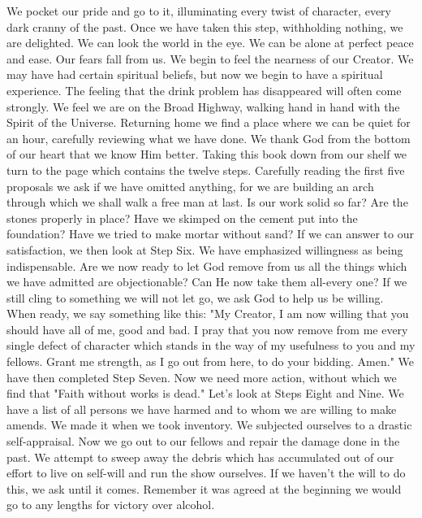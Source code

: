 \begin{biblechapter}
We pocket our pride and go to it, illuminating every twist of character, every dark cranny of the past.  Once we have taken this step, withholding nothing, we are delighted.  We can look the world in the eye.  We can be alone at perfect peace and ease.  Our fears fall from us.  We begin to feel the nearness of our Creator.  We may have had certain spiritual beliefs, but now we begin to have a spiritual experience.  The feeling that the drink problem has disappeared will often come strongly.  We feel we are on the Broad Highway, walking hand in hand with the Spirit of the Universe.
Returning home we find a place where we can be quiet for an hour, carefully reviewing what we have done.  We thank God from the bottom of our heart that we know Him better.  Taking this book down from our shelf we turn to the page which contains the twelve steps.  Carefully reading the first five proposals we ask if we have omitted anything, for we are building an arch through which we shall walk a free man at last.  Is our work solid so far?  Are the stones properly in place?  Have we skimped on the cement put into the foundation?  Have we tried to make mortar without sand?
If we can answer to our satisfaction, we then look at Step Six.  We have emphasized willingness as being indispensable.  Are we now ready to let God remove from us all the things which we have admitted are objectionable?  Can He now take them all-every one?  If we still cling to something we will not let go, we ask God to help us be willing.
When ready, we say something like this: "My Creator, I am now willing that you should have all of me, good and bad.  I pray that you now remove from me every single defect of character which stands in the way of my usefulness to you and my fellows.  Grant me strength, as I go out from here, to do your bidding.  Amen."  We have then completed Step Seven.
Now we need more action, without which we find that "Faith without works is dead."  Let's look at Steps Eight and Nine.  We have a list of all persons we have harmed and to whom we are willing to make amends.  We made it when we took inventory.  We subjected ourselves to a drastic self-appraisal.  Now we go out to our fellows and repair the damage done in the past.  We attempt to sweep away the debris which has accumulated out of our effort to live on self-will and run the show ourselves.  If we haven't the will to do this, we ask until it comes.  Remember it was agreed at the beginning we would go to any lengths for victory over alcohol.

\end{biblechapter}
